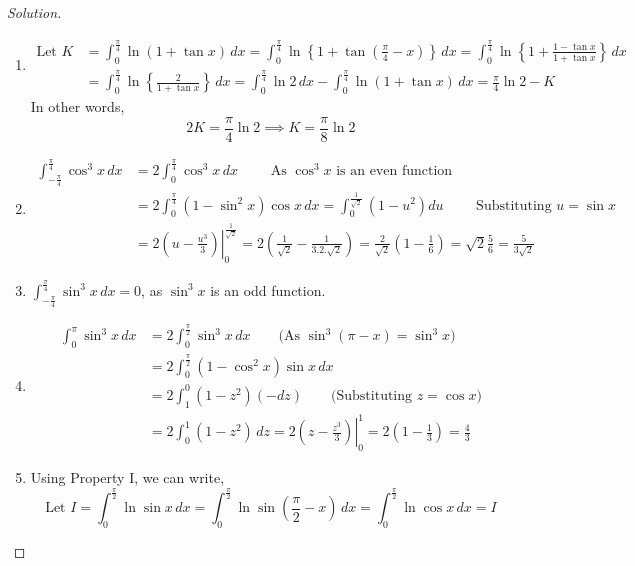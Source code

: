 \documentclass{book}
\theoremstyle{definition}
\newenvironment{solution}
    {\begin{proof}[Solution]}
    {\end{proof}}
\begin{document}
\begin{solution}
\begin{enumerate}[label=(\roman*)]

\item 
\begin{align*}
    \text{Let } K&=\int_0^{\frac{\pi}{4}}\ln(1+\tan x)\,dx = \int_0^{\frac{\pi}{4}}\ln\left\{1+\tan \left(\frac{\pi}{4}-x\right)\right\}\,dx = \int_0^{\frac{\pi}{4}}\ln\left\{1+\frac{1-\tan x}{1+\tan x}\right\}\,dx \\ 
    &= \int_0^{\frac{\pi}{4}}\ln \left\{\frac{2}{1+\tan x}\right\}\,dx = \int_0^{\frac{\pi}{4}}\ln 2\,dx-\int_0^{\frac{\pi}{4}}\ln (1+\tan x)\,dx = \frac{\pi}{4}\ln 2-K
\end{align*}
In other words,
\[
2K=\frac{\pi}{4}\ln 2 \implies K = \frac{\pi}{8}\ln 2
\]

\item 
\begin{align*}
\int_{-\frac{\pi}{4}}^{\frac{\pi}{4}}\cos^3 x\,dx &= 2\int_0^{\frac{\pi}{4}}\cos^3 x\,dx \qquad \text{ As $\cos^3 x$ is an even function} \\ 
&= 2\int_0^{\frac{\pi}{4}}(1-\sin^2 x)\cos x\,dx = \int_0^{\frac{1}{\sqrt{2}}}(1-u^2)du \qquad \text{ Substituting $u=\sin x$} \\
&= 2\left.\left(u-\frac{u^3}{3}\right)\right\vert_0^{\frac{1}{\sqrt{2}}} = 2\left(\frac{1}{\sqrt{2}}-\frac{1}{3.2.\sqrt{2}}\right)=\frac{2}{\sqrt{2}}\left(1-\frac{1}{6}\right) = \sqrt{2}\frac{5}{6}= \frac{5}{3\sqrt{2}}
\end{align*}


\item $\displaystyle\int_{-\frac{\pi}{4}}^{\frac{\pi}{4}}\sin^3 x\,dx=0$, as $\sin^3 x$ is an odd function.

\item 
\begin{align*}
\int_0^{\pi}\sin^3 x\,dx &= 2\int_0^{\frac{\pi}{2}}\sin^3 x\,dx \qquad \text{(As $\sin^3 (\pi-x)=\sin^3 x$)} \\
&= 2\int_0^{\frac{\pi}{2}}(1-\cos^2 x)\sin x\,dx \\
&= 2\int_1^0(1-z^2)(-dz) \qquad \text{(Substituting $z=\cos x$)} \\
&= 2\int_0^1(1-z^2)\,dz = 2\left.\left(z-\frac{z^3}{3}\right)\right\vert_0^1 = 2\left(1-\frac{1}{3}\right)=\frac{4}{3}
\end{align*}

\item Using Property I, we can write,
\[
\text{Let } I=\int_0^{\frac{\pi}{2}}\ln \sin x\,dx = \displaystyle\int_0^{\frac{\pi}{2}}\ln \sin (\frac{\pi}{2}-x)\,dx = \int_0^{\frac{\pi}{2}}\ln \cos x\,dx = I
\]


\end{enumerate}
\end{solution}
\end{document}
